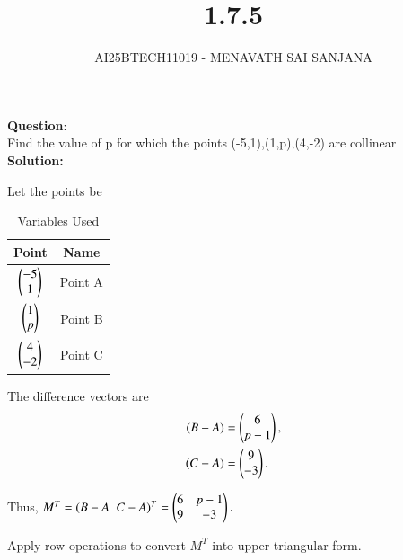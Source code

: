 \documentclass[journal]{IEEEtran}
\begin{document}

\vspace{3cm}

\title{1.7.5}
\author{AI25BTECH11019 - MENAVATH SAI SANJANA}
{\let\newpage\relax\maketitle}

\renewcommand{\thefigure}{\theenumi}
\renewcommand{\thetable}{\theenumi}
\setlength{\intextsep}{10pt} %


\renewcommand{\thetable}{\theenumi}

\textbf{Question}:\\
 Find the value of p for which the points (-5,1),(1,p),(4,-2) are collinear 
\\
\bigskip
\textbf{Solution: }

Let the points be

\begin{table}[h!]
\centering
\begin{tabular}{|c|c|}
\hline
\textbf{Point} & \textbf{Name} \\
\hline
$\begin{pmatrix}-5 \\ 1\end{pmatrix}$ & Point A \\
\hline
$\begin{pmatrix}1 \\ p\end{pmatrix}$ & Point B \\
\hline
$\begin{pmatrix}4 \\ -2\end{pmatrix}$ & Point C \\
\hline
\end{tabular}
\caption{Variables Used}
\end{table}



The difference vectors are
\begin{align}
(B-A) &= \begin{pmatrix}6 \\ p-1\end{pmatrix}, \\
(C-A) &= \begin{pmatrix}9 \\ -3\end{pmatrix}.
\end{align}

Thus,
$
M^T = (B-A \;\; C-A)^T 
= \begin{pmatrix}6 & p-1 \\ 9 & -3\end{pmatrix}.
$

Apply row operations to convert $M^T$ into upper triangular form.
\end{document}
